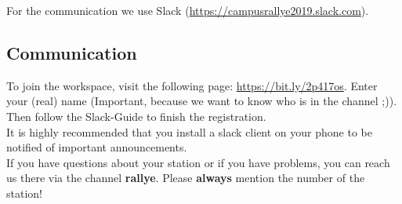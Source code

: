 For the communication we use Slack (\url{https://campusrallye2019.slack.com}).

\subsection*{Communication}
To join the workspace, visit the following page: \url{https://bit.ly/2p417os}.  
Enter your (real) name (Important, because we want to know who is in the channel ;)). Then follow the Slack-Guide to finish the registration. \\ 

It is highly recommended that you install a slack client on your phone to be notified of important announcements. \\

If you have questions about your station or if you have problems, you can reach us there via the channel \textbf{rallye}. Please \textbf{always} mention the number of the station! \\

